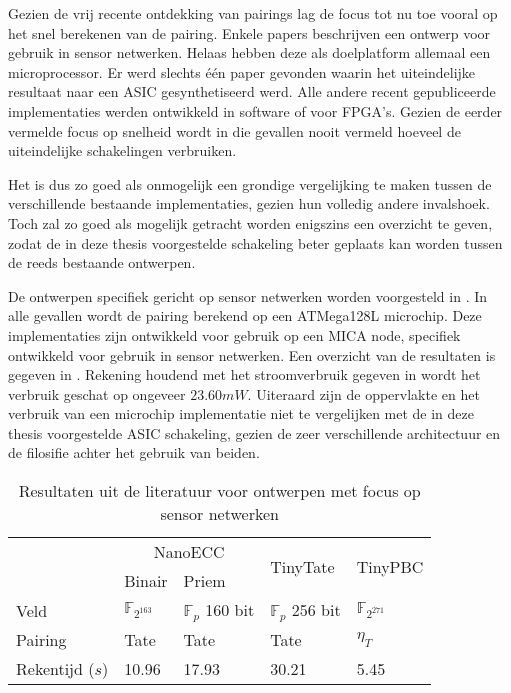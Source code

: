Gezien de vrij recente ontdekking van pairings lag de focus tot nu toe vooral op het snel berekenen van de pairing. Enkele papers beschrijven een ontwerp voor gebruik in sensor netwerken. Helaas hebben deze als doelplatform allemaal een microprocessor. Er werd slechts \'e\'en paper gevonden waarin het uiteindelijke resultaat naar een ASIC gesynthetiseerd werd. Alle andere recent gepubliceerde implementaties werden ontwikkeld in software of voor FPGA's. Gezien de eerder vermelde focus op snelheid wordt in die gevallen nooit vermeld hoeveel de uiteindelijke schakelingen verbruiken.

Het is dus zo goed als onmogelijk een grondige vergelijking te maken tussen de verschillende bestaande implementaties, gezien hun volledig andere invalshoek. Toch zal zo goed als mogelijk getracht worden enigszins een overzicht te geven, zodat de in deze thesis voorgestelde schakeling beter geplaats kan worden tussen de reeds bestaande ontwerpen.

De ontwerpen specifiek gericht op sensor netwerken worden voorgesteld in \cite{tinypbc, tinytate, nanoecc}. In alle gevallen wordt de pairing berekend op een ATMega128L microchip. Deze implementaties zijn ontwikkeld voor gebruik op een MICA node, specifiek ontwikkeld voor gebruik in sensor netwerken. Een overzicht van de resultaten is gegeven in . Rekening houdend met het stroomverbruik gegeven in \cite{nanoecc} wordt het verbruik geschat op ongeveer $23.60mW$. Uiteraard zijn de oppervlakte en het verbruik van een microchip implementatie niet te vergelijken met de in deze thesis voorgestelde ASIC schakeling, gezien de zeer verschillende architectuur en de filosifie achter het gebruik van beiden.

\begin{table}[h]
	\caption{Resultaten uit de literatuur voor ontwerpen met focus op sensor netwerken}
	\label{tabel-resultaten-sensor}

	\centering
	\begin{tabular}{|l|l|l|l|l|}
		\hline
		&	\multicolumn{2}{c|}{NanoECC \cite{nanoecc}}	& \multirow{2}{*}{TinyTate \cite{tinytate}}	& \multirow{2}{*}{TinyPBC \cite{tinypbc}}\\
		\cline{2-3}
		& Binair	& Priem	&	& \\
 		\hline \hline
		Veld	& $\mathbb{F}_{2^{163}}$	& $\mathbb{F}_{p}$ 160 bit	& $\mathbb{F}_{p}$ 256 bit	& $\mathbb{F}_{2^{271}}$ \\ \hline
		Pairing	& Tate	& Tate	& Tate	& $\eta_T$ \\ \hline
		Rekentijd ($s$)	& 	10.96	& 17.93	& 30.21	& 5.45\\
		\hline		
	\end{tabular}
\end{table}

